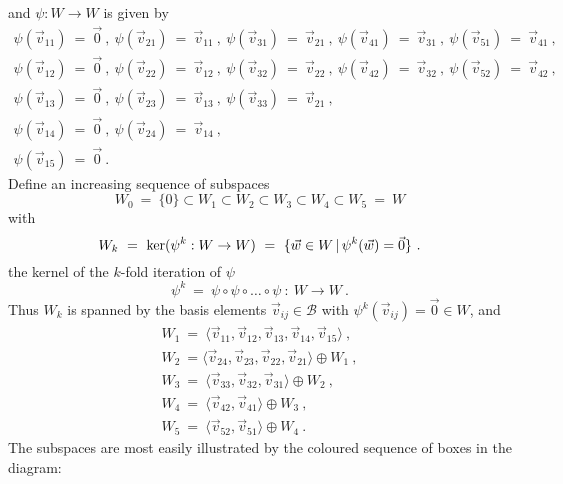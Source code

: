 \documentclass[11pt]{amsbook}
\theoremstyle{definition}
\begin{document}
and $\psi:W \to W$ is given by
$$\begin{array}{l}
\psi(\vec{v}_{11})~=~\vec{0}~,~\psi(\vec{v}_{21})~=~\vec{v}_{11}~,~\psi(\vec{v}_{31})~=~\vec{v}_{21}~,~
\psi(\vec{v}_{41})~=~\vec{v}_{31}~,~\psi(\vec{v}_{51})~=~\vec{v}_{41}~,\\[1ex]
\psi(\vec{v}_{12})~=~\vec{0}~,~\psi(\vec{v}_{22})~=~\vec{v}_{12}~,~\psi(\vec{v}_{32})~=~\vec{v}_{22}~,~
\psi(\vec{v}_{42})~=~\vec{v}_{32}~,~\psi(\vec{v}_{52})~=~\vec{v}_{42}~,\\[1ex]
\psi(\vec{v}_{13})~=~\vec{0}~,~\psi(\vec{v}_{23})~=~\vec{v}_{13}~,~\psi(\vec{v}_{33})~=~\vec{v}_{21}~,\\[1ex]
\psi(\vec{v}_{14})~=~\vec{0}~,~\psi(\vec{v}_{24})~=~\vec{v}_{14}~,\\[1ex]
\psi(\vec{v}_{15})~=~\vec{0}~.
\end{array}$$
Define an increasing sequence of subspaces
$$W_0~=~\{0\} \subset W_1 \subset W_2 \subset W_3 \subset W_4 \subset W_5~=~W$$
with 
$$W_k~=~{\rm ker}(\psi^k:W \to W)~=~\{\vec{w} \in W\,\vert\, \psi^k(\vec{w})=\vec{0}\}~.$$
the kernel of the $k$-fold iteration of $\psi$
$$\psi^k~=~\psi \circ \psi \circ \dots \circ \psi~:~W \to W~.$$ 
Thus $W_k$ is spanned by the basis elements $\vec{v}_{ij} \in {\mathcal B}$ with $\psi^k(\vec{v}_{ij})=\vec{0} \in W$, and
$$\begin{array}{l}
W_1~=~\langle\vec{v}_{11},\vec{v}_{12},\vec{v}_{13},\vec{v}_{14},\vec{v}_{15}\rangle~,\\[1ex]
W_2~=\langle\vec{v}_{24},\vec{v}_{23},\vec{v}_{22},\vec{v}_{21}\rangle \oplus W_1~,\\[1ex]
W_3~=~ \langle\vec{v}_{33},\vec{v}_{32},\vec{v}_{31}\rangle\oplus W_2~,\\[1ex]
W_4~=~\langle\vec{v}_{42},\vec{v}_{41}\rangle\oplus W_3~,\\[1ex]
W_5~=~\langle\vec{v}_{52},\vec{v}_{51}\rangle\oplus W_4~.
\end{array}$$
The subspaces are most easily illustrated by the coloured sequence of boxes in the diagram:
\end{document}
